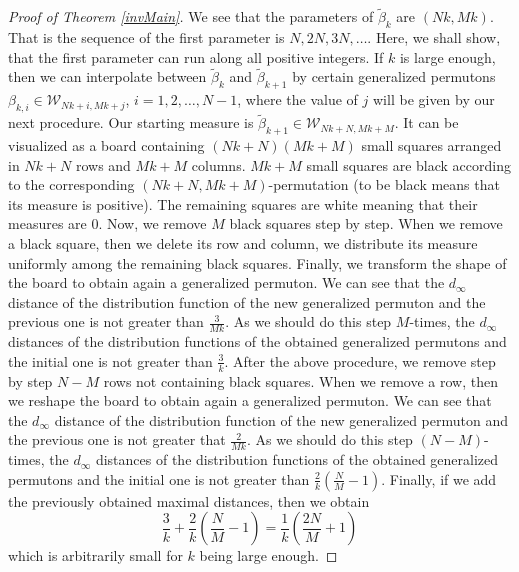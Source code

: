 \documentclass[12pt,twoside]{article}
\theoremstyle{definition}
\theoremstyle{remark}
\numberwithin{equation}{section}
\theoremstyle{plain}
\theoremstyle{remark}
\def\WD{{\mathcal W}}
\begin{document}
\begin{proof}[Proof of Theorem \ref{invMain}]
We see that the parameters of $\tilde{\beta}_k$ are $(Nk, Mk)$.
That is the sequence of the first parameter is $N, 2N, 3N,\dots$.
Here, we shall show, that the first parameter can run along all positive integers.
If $k$ is large enough, then we can interpolate between $\tilde{\beta}_k$ and $\tilde{\beta}_{k+1}$
by certain generalized permutons $\beta_{k,i} \in \WD_{Nk+i, Mk+j}$, $i=1,2,\dots , N-1$,
where the value of $j$ will be given by our next procedure.
Our starting measure is $\tilde{\beta}_{k+1} \in \WD_{Nk+N, Mk+M}$.
It can be visualized as a board containing $(Nk+N)(Mk+M)$ small squares arranged in 
$Nk+N$ rows and  $Mk+M$ columns.
$Mk+M$ small squares are black according to the corresponding
$(Nk+N,Mk+M)$-permutation
(to be black means that its measure is positive).
The remaining squares are white meaning that their measures are $0$.
Now, we remove $M$ black squares step by step.
When we remove a black square, then we delete its row and column, we distribute its measure
uniformly among the remaining black squares.
Finally, we transform the shape of the board 
to obtain again a generalized permuton.
We can see that the $d_\infty$ distance of the distribution function of the new generalized permuton and
the previous one is not greater than $\frac{3}{Mk}$.
As we should do this step $M$-times, the $d_\infty$ distances of the distribution functions of the obtained
 generalized permutons and the initial one is not greater than $\frac{3}{k}$.
After the above procedure, we remove step by step $N-M$ rows not containing black squares.
When we remove a row, then we reshape  the board to obtain again a generalized permuton.
We can see that the $d_\infty$ distance of the distribution function of the new generalized permuton and
the previous one is not greater that $\frac{2}{Mk}$.
As we should do this step $(N-M)$-times, the $d_\infty$ distances of the distribution functions of the obtained
 generalized permutons and the initial one is not greater than $\frac{2}{k}\left(\frac{N}{M} - 1 \right)$.
 Finally, if we add the previously obtained maximal distances, then we obtain 
 $$
 \frac{3}{k} +\frac{2}{k}\left(\frac{N}{M} - 1 \right) = \frac{1}{k}\left(\frac{2N}{M} +1 \right)
$$
which is arbitrarily small for $k$ being large enough.
\end{proof}
\end{document}
